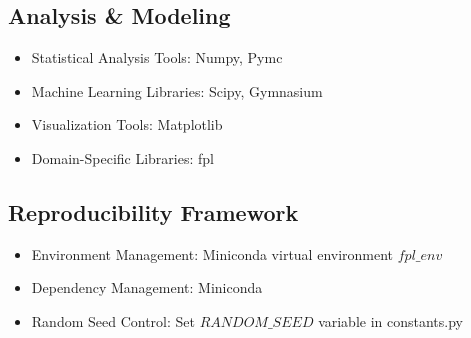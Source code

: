 \subsection{Analysis \& Modeling}
\begin{itemize}
    \item Statistical Analysis Tools: Numpy, Pymc
    \item Machine Learning Libraries: Scipy, Gymnasium
    \item Visualization Tools: Matplotlib
    \item Domain-Specific Libraries: fpl \cite{macLeod2019}
\end{itemize}

\subsection{Reproducibility Framework}
\begin{itemize}
    \item Environment Management: Miniconda virtual environment $fpl\_env$
    \item Dependency Management: Miniconda 
    \item Random Seed Control: Set $RANDOM\_ SEED$ variable in constants.py
\end{itemize}

